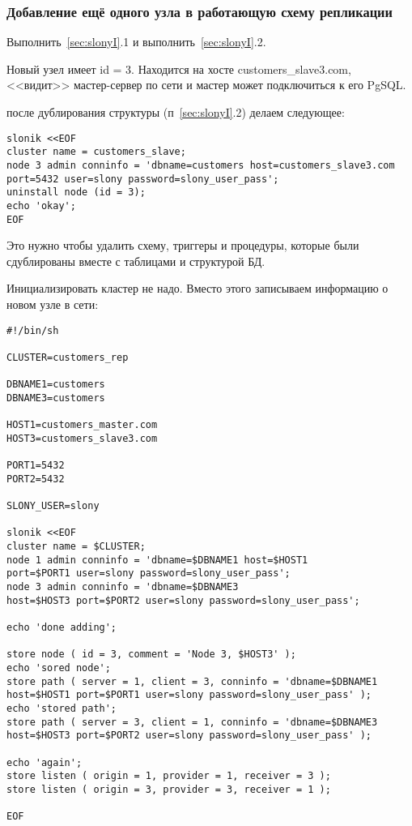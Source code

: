 \subsubsection{Добавление ещё одного узла в работающую схему репликации}
Выполнить~\ref{sec:slonyI}.1 и выполнить~\ref{sec:slonyI}.2.

Новый узел имеет id = 3. Находится на хосте customers\_slave3.com, <<видит>> мастер-сервер по сети и 
мастер может подключиться к его PgSQL. 

после дублирования структуры (п~\ref{sec:slonyI}.2) делаем следующее:
\begin{verbatim}
slonik <<EOF
cluster name = customers_slave;
node 3 admin conninfo = 'dbname=customers host=customers_slave3.com 
port=5432 user=slony password=slony_user_pass';
uninstall node (id = 3);
echo 'okay';
EOF
\end{verbatim}

Это нужно чтобы удалить схему, триггеры и процедуры, которые были сдублированы вместе с таблицами и структурой БД.

Инициализировать кластер не надо. Вместо этого записываем информацию о новом узле в сети:
\begin{verbatim}
#!/bin/sh

CLUSTER=customers_rep

DBNAME1=customers
DBNAME3=customers

HOST1=customers_master.com
HOST3=customers_slave3.com

PORT1=5432
PORT2=5432

SLONY_USER=slony

slonik <<EOF
cluster name = $CLUSTER;
node 1 admin conninfo = 'dbname=$DBNAME1 host=$HOST1 
port=$PORT1 user=slony password=slony_user_pass';
node 3 admin conninfo = 'dbname=$DBNAME3 
host=$HOST3 port=$PORT2 user=slony password=slony_user_pass';

echo 'done adding';

store node ( id = 3, comment = 'Node 3, $HOST3' );
echo 'sored node';
store path ( server = 1, client = 3, conninfo = 'dbname=$DBNAME1 
host=$HOST1 port=$PORT1 user=slony password=slony_user_pass' );
echo 'stored path';
store path ( server = 3, client = 1, conninfo = 'dbname=$DBNAME3 
host=$HOST3 port=$PORT2 user=slony password=slony_user_pass' );

echo 'again';
store listen ( origin = 1, provider = 1, receiver = 3 );
store listen ( origin = 3, provider = 3, receiver = 1 );

EOF
\end{verbatim}

